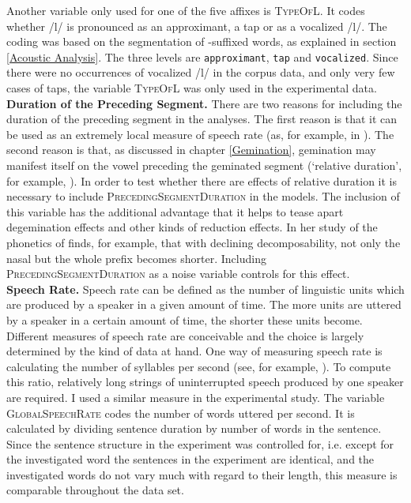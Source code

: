 Another variable only used for one of the five affixes is \textsc{TypeOfL}. It codes whether /l/ is pronounced as an approximant, a tap or as a vocalized /l/. The coding was based on the segmentation of -suffixed words, as explained in section \ref{Acoustic Analysis}. The three levels are \texttt{approximant}, \texttt{tap} and \texttt{vocalized}.  Since there were no occurrences of vocalized /l/ in the corpus data, and only very few cases of taps, the variable \textsc{TypeOfL} was only used in the experimental data.\\


\textbf{Duration of the Preceding Segment.} There are two reasons for including the duration of the preceding segment in the analyses. The first reason is that it can be used as an extremely local measure of speech rate (as, for example, in \citealt{Ernestus.2006}). The second reason is that, as discussed in chapter \ref{Gemination}, gemination may manifest itself on the vowel preceding the geminated segment (`relative duration', for example, \citealt{Ridouane.2010, Miller.1987, Oh.2012}). In order to test whether there are effects of relative duration it is necessary to include \textsc{PrecedingSegmentDuration} in the models. The inclusion of this variable has the additional advantage that it helps to tease apart degemination effects and other kinds of reduction effects. In her study of the phonetics of  \cite{Hay.2007} finds, for example, that with declining decomposability,  not only the nasal but the whole prefix becomes shorter. Including \textsc{PrecedingSegmentDuration} as a noise variable controls for this effect. \\


\textbf{Speech Rate.} Speech rate can be defined as the number of linguistic units which are produced by a speaker in a given amount of time. The more units are uttered by a speaker in a certain amount of time, the shorter these units become. Different measures of speech rate are conceivable and the choice is largely determined by the kind of data at hand. One way of measuring speech rate is calculating the number of syllables per second (see, for example, \citealt{Pluymaekers.2005, Plag.2017}). To compute this ratio, relatively long strings of uninterrupted speech produced by one speaker are required.  I used a similar measure in the experimental study. The variable \textsc{GlobalSpeechRate} codes the number of words uttered per second. It is calculated by dividing sentence duration by number of words in the sentence. Since the sentence structure in the experiment was controlled for, i.e. except for the investigated word the sentences in the experiment are identical, and the investigated words do not vary much with regard to their length, this measure is comparable throughout the data set. 

